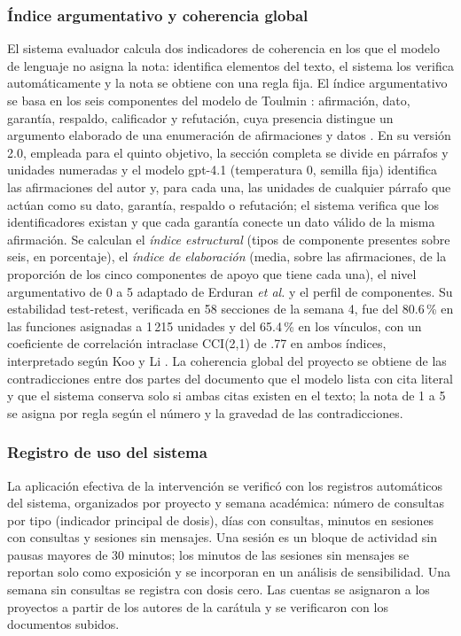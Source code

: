 \documentclass[journal]{IEEEtran}
\begin{document}
\subsubsection{Índice argumentativo y coherencia global}
El sistema evaluador calcula dos indicadores de coherencia en los que el modelo de lenguaje no asigna la nota: identifica elementos del texto, el sistema los verifica automáticamente y la nota se obtiene con una regla fija. El índice argumentativo se basa en los seis componentes del modelo de Toulmin \cite{toulmin2003}: afirmación, dato, garantía, respaldo, calificador y refutación, cuya presencia distingue un argumento elaborado de una enumeración de afirmaciones y datos \cite{erduran2004,qin2010}. En su versión 2.0, empleada para el quinto objetivo, la sección completa se divide en párrafos y unidades numeradas y el modelo gpt-4.1 (temperatura 0, semilla fija) identifica las afirmaciones del autor y, para cada una, las unidades de cualquier párrafo que actúan como su dato, garantía, respaldo o refutación; el sistema verifica que los identificadores existan y que cada garantía conecte un dato válido de la misma afirmación. Se calculan el \emph{índice estructural} (tipos de componente presentes sobre seis, en porcentaje), el \emph{índice de elaboración} (media, sobre las afirmaciones, de la proporción de los cinco componentes de apoyo que tiene cada una), el nivel argumentativo de 0 a 5 adaptado de Erduran \emph{et al.} \cite{erduran2004} y el perfil de componentes. Su estabilidad test-retest, verificada en 58 secciones de la semana 4, fue del 80.6\,\% en las funciones asignadas a 1\,215 unidades y del 65.4\,\% en los vínculos, con un coeficiente de correlación intraclase CCI(2,1) de .77 en ambos índices, interpretado según Koo y Li \cite{koo2016}. La coherencia global del proyecto se obtiene de las contradicciones entre dos partes del documento que el modelo lista con cita literal y que el sistema conserva solo si ambas citas existen en el texto; la nota de 1 a 5 se asigna por regla según el número y la gravedad de las contradicciones.

\subsubsection{Registro de uso del sistema}
La aplicación efectiva de la intervención se verificó con los registros automáticos del sistema, organizados por proyecto y semana académica: número de consultas por tipo (indicador principal de dosis), días con consultas, minutos en sesiones con consultas y sesiones sin mensajes. Una sesión es un bloque de actividad sin pausas mayores de 30 minutos; los minutos de las sesiones sin mensajes se reportan solo como exposición y se incorporan en un análisis de sensibilidad. Una semana sin consultas se registra con dosis cero. Las cuentas se asignaron a los proyectos a partir de los autores de la carátula y se verificaron con los documentos subidos.
\end{document}
